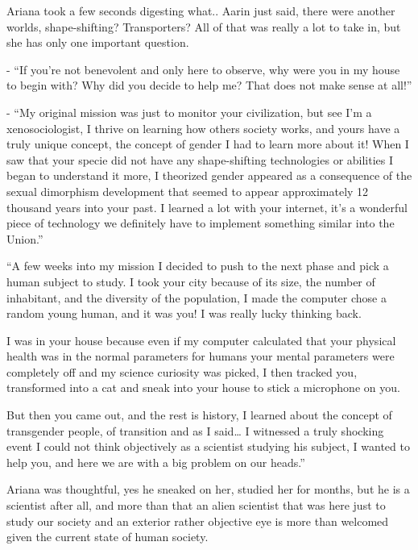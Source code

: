 \documentclass[hidelinks,12pt,a4paper]{book}
\begin{document}
Ariana took a few seconds digesting what.. Aarin just said, there were another worlds, shape-shifting? Transporters? 
All of that was really a lot to take in, but she has only one important question.\par
\bigskip

- “If you're not benevolent and only here to observe, why were you in my house to begin with? 
Why did you decide to help me? That does not make sense at all!”\par
\bigskip

- “My original mission was just to monitor your civilization, but see I'm a xenosociologist, I thrive on learning 
how others society works, and yours have a truly unique concept, the concept of gender I had to learn more about it! 
When I saw that your specie did not have any shape-shifting technologies or abilities I began to
 understand it more, I theorized gender appeared as a consequence of the sexual dimorphism development 
 that seemed to appear approximately 12 thousand years into your past. I learned a lot with your internet, 
 it's a wonderful piece of technology we definitely have to implement something similar into the Union.”\par
 \bigskip

“A few weeks into my mission I decided to push to the next phase and pick a human subject to study. I took your city 
because of its size, the number of inhabitant, and the diversity of the population, I made the computer chose a 
random young human, and it was you! I was really lucky thinking back.\par
\bigskip

I was in your house because even if my computer calculated that your physical health was in the normal parameters 
for humans your mental parameters were completely off and my science curiosity was picked, I then tracked you,
 transformed into a cat and sneak into your house to stick a microphone on you. \par
 \bigskip

But then you came out, and the rest is history, I learned about the concept of transgender people, of 
transition and as I said… I witnessed a truly shocking event I could not think objectively as a scientist 
studying his subject, I wanted to help you, and here we are with a big problem on our heads.”\par
\bigskip

Ariana was thoughtful, yes he sneaked on her, studied her for months, but he is a scientist after all, 
and more than that an alien scientist that was here just to study our society and an exterior rather objective 
eye is more than welcomed given the current state of human society.\par
\bigskip
\end{document}

